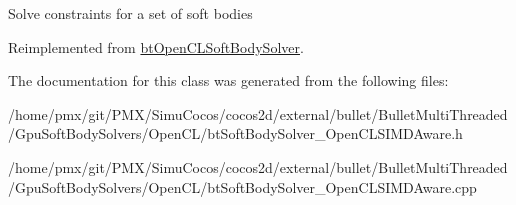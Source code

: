 Solve constraints for a set of soft bodies 

Reimplemented from \hyperlink{classbtOpenCLSoftBodySolver_a24daba36a553aeb1d49158cd804e039a}{bt\+Open\+C\+L\+Soft\+Body\+Solver}.



The documentation for this class was generated from the following files\+:\begin{DoxyCompactItemize}
\item 
/home/pmx/git/\+P\+M\+X/\+Simu\+Cocos/cocos2d/external/bullet/\+Bullet\+Multi\+Threaded/\+Gpu\+Soft\+Body\+Solvers/\+Open\+C\+L/bt\+Soft\+Body\+Solver\+\_\+\+Open\+C\+L\+S\+I\+M\+D\+Aware.\+h\item 
/home/pmx/git/\+P\+M\+X/\+Simu\+Cocos/cocos2d/external/bullet/\+Bullet\+Multi\+Threaded/\+Gpu\+Soft\+Body\+Solvers/\+Open\+C\+L/bt\+Soft\+Body\+Solver\+\_\+\+Open\+C\+L\+S\+I\+M\+D\+Aware.\+cpp\end{DoxyCompactItemize}

